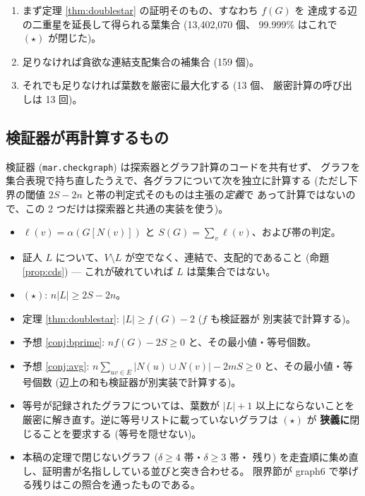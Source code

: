 \documentclass[paper=a4,fontsize=10.5pt,jafontsize=10.5pt]{jlreq}
\theoremstyle{plain}
\theoremstyle{definition}
\begin{document}
\begin{enumerate}
\item まず定理 \ref{thm:doublestar} の証明そのもの、すなわち $f(G)$ を
  達成する辺の二重星を延長して得られる葉集合 (13,402,070 個、
  99.999\% はこれで $(\star)$ が閉じた)。
\item 足りなければ貪欲な連結支配集合の補集合 (159 個)。
\item それでも足りなければ葉数を厳密に最大化する (13 個、
  厳密計算の呼び出しは 13 回)。
\end{enumerate}

\subsection*{検証器が再計算するもの}

検証器 (\texttt{mar.checkgraph}) は探索器とグラフ計算のコードを共有せず、
グラフを集合表現で持ち直したうえで、各グラフについて次を独立に計算する
(ただし下界の閾値 $2S - 2n$ と帯の判定式そのものは主張の\emph{定義}で
あって計算ではないので、この 2 つだけは探索器と共通の実装を使う)。

\begin{itemize}
\item $\ell(v) = \alpha(G[N(v)])$ と $S(G) = \sum_v \ell(v)$、および帯の判定。
\item 証人 $L$ について、$V \setminus L$ が空でなく、連結で、支配的であること
  (命題 \ref{prop:cds}) --- これが破れていれば $L$ は葉集合ではない。
\item $(\star)$: $n|L| \ge 2S - 2n$。
\item 定理 \ref{thm:doublestar}: $|L| \ge f(G) - 2$ ($f$ も検証器が
  別実装で計算する)。
\item 予想 \ref{conj:bprime}: $n f(G) - 2S \ge 0$ と、その最小値・等号個数。
\item 予想 \ref{conj:avg}: $n \sum_{uv \in E} |N(u) \cup N(v)| - 2mS
  \ge 0$ と、その最小値・等号個数 (辺上の和も検証器が別実装で計算する)。
\item 等号が記録されたグラフについては、葉数が $|L| + 1$ 以上にならないことを
  厳密に解き直す。逆に等号リストに載っていないグラフは $(\star)$ が
  \textbf{狭義に}閉じることを要求する (等号を隠せない)。
\item 本稿の定理で閉じないグラフ ($\delta \ge 4$ 帯・$\delta \ge 3$ 帯・
  残り) を走査順に集め直し、証明書が名指ししている並びと突き合わせる。
  限界節が graph6 で挙げる残りはこの照合を通ったものである。
\end{itemize}
\end{document}
